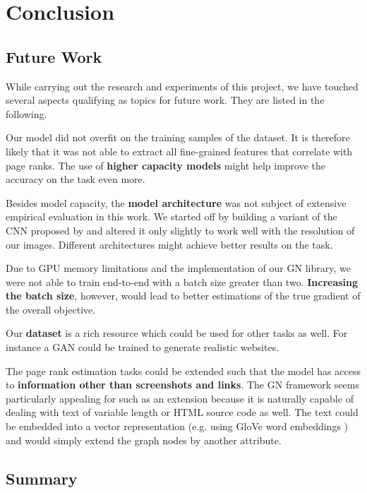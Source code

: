 \section{Conclusion}
\label{sec:conclusion}

\subsection{Future Work}

While carrying out the research and experiments of this project, we have touched several aspects qualifying as topics for future work. They are listed in the following.

Our model did not overfit on the training samples of the dataset. It is therefore likely that it was not able to extract all fine-grained features that correlate with page ranks. The use of \textbf{higher capacity models} might help improve the accuracy on the task even more.

Besides model capacity, the \textbf{model architecture} was not subject of extensive empirical evaluation in this work. We started off by building a variant of the CNN proposed by \cite{beltramelli:pix2code} and altered it only slightly to work well with the resolution of our images. Different architectures might achieve better results on the task.

Due to GPU memory limitations and the implementation of our GN library, we were not able to train end-to-end with a batch size greater than two. \textbf{Increasing the batch size}, however, would lead to better estimations of the true gradient of the overall objective.

Our \textbf{dataset} is a rich resource which could be used for other tasks as well. For instance a GAN \cite{goodfellow2014generative} could be trained to generate realistic websites.

The page rank estimation tasks could be extended such that the model has access to \textbf{information other than screenshots and links}. The GN framework seems particularly appealing for such as an extension because it is naturally capable of dealing with text of variable length or HTML source code as well. The text could be embedded into a vector representation (e.g. using GloVe word embeddings \cite{pennington2014:glove}) and would simply extend the graph nodes by another attribute.

\subsection{Summary}

